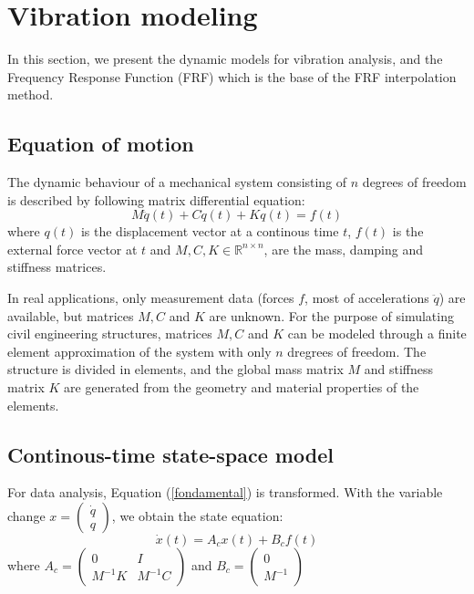 \documentclass[journal]{IEEEtran}
\begin{document}
\section{Vibration modeling}

In this section, we present the dynamic models for vibration analysis, and the Frequency Response Function (FRF) which is the base of the FRF interpolation method.

\subsection{Equation of motion}

The dynamic behaviour of a mechanical system consisting of $n$ degrees of freedom is described by following matrix differential equation:
\begin{equation}
M \ddot{q}(t) + C \dot{q}(t) + K q(t) = f(t)
\label{fondamental}
\end{equation}
where $q(t)$ is the displacement vector at a continous time $t$, $f(t)$ is the external force vector at $t$ and $M, C, K \in \mathbb{R}^{n \times n}$, are the mass, damping and stiffness matrices.

In real applications, only measurement data (forces $f$, most of accelerations $\ddot{q}$) are available, but matrices $M, C$ and $K$ are unknown.
For the purpose of simulating civil engineering structures, matrices $M, C$ and $K$ can be modeled through a
finite element approximation of the system with only $n$ dregrees of freedom.
The structure is divided in elements, and the global mass matrix $M$ and stiffness matrix $K$ are generated from the geometry and material
properties of the elements.

\subsection{Continous-time state-space model} %

For data analysis, Equation (\ref{fondamental}) is transformed. With the variable change $x =
\begin{pmatrix}
\dot{q} \\
q
\end{pmatrix}$, we obtain the state equation:
\begin{equation}
\dot{x}(t) = A_cx(t) + B_cf(t)
\end{equation}
 where
$A_c =
\begin{pmatrix}
0 & I \\
M^{-1}K & M^{-1}C
\end{pmatrix}$
and
$B_c=
\begin{pmatrix}
0 \\
M^{-1}
\end{pmatrix}$
\end{document}
